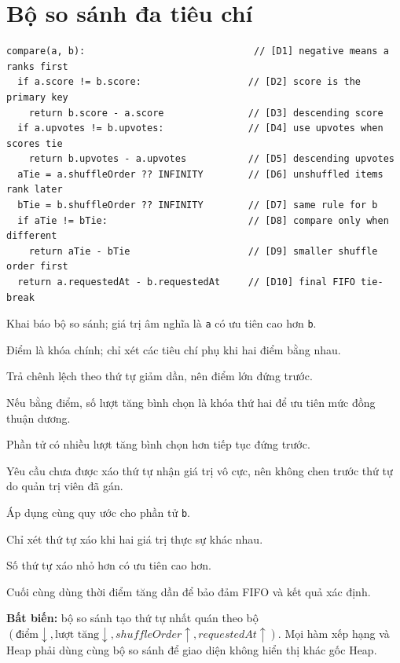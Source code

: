 \documentclass[12pt,a4paper,twoside,openright]{report}
\newcommand{\code}[1]{\texttt{#1}}
\begin{document}
\section{Bộ so sánh đa tiêu chí}
\begin{lstlisting}[style=algorithm]
compare(a, b):                              // [D1] negative means a ranks first
  if a.score != b.score:                   // [D2] score is the primary key
    return b.score - a.score               // [D3] descending score
  if a.upvotes != b.upvotes:               // [D4] use upvotes when scores tie
    return b.upvotes - a.upvotes           // [D5] descending upvotes
  aTie = a.shuffleOrder ?? INFINITY        // [D6] unshuffled items rank later
  bTie = b.shuffleOrder ?? INFINITY        // [D7] same rule for b
  if aTie != bTie:                         // [D8] compare only when different
    return aTie - bTie                     // [D9] smaller shuffle order first
  return a.requestedAt - b.requestedAt     // [D10] final FIFO tie-break
\end{lstlisting}
\begin{description}[leftmargin=1.2cm,labelwidth=0.8cm,style=multiline,
  font=\ttfamily\bfseries,itemsep=2pt]
  \item[D1] Khai báo bộ so sánh; giá trị âm nghĩa là \code{a} có ưu tiên cao hơn \code{b}.
  \item[D2] Điểm là khóa chính; chỉ xét các tiêu chí phụ khi hai điểm bằng nhau.
  \item[D3] Trả chênh lệch theo thứ tự giảm dần, nên điểm lớn đứng trước.
  \item[D4] Nếu bằng điểm, số lượt tăng bình chọn là khóa thứ hai để ưu tiên mức đồng thuận dương.
  \item[D5] Phần tử có nhiều lượt tăng bình chọn hơn tiếp tục đứng trước.
  \item[D6] Yêu cầu chưa được xáo thứ tự nhận giá trị vô cực, nên không chen trước thứ tự
  do quản trị viên đã gán.
  \item[D7] Áp dụng cùng quy ước cho phần tử \code{b}.
  \item[D8] Chỉ xét thứ tự xáo khi hai giá trị thực sự khác nhau.
  \item[D9] Số thứ tự xáo nhỏ hơn có ưu tiên cao hơn.
  \item[D10] Cuối cùng dùng thời điểm tăng dần để bảo đảm FIFO và kết quả xác định.
\end{description}
\textbf{Bất biến:} bộ so sánh tạo thứ tự nhất quán theo bộ
$(\text{điểm}\downarrow,\text{lượt tăng}\downarrow,shuffleOrder\uparrow,requestedAt\uparrow)$.
Mọi hàm xếp hạng và Heap phải dùng cùng bộ so sánh để giao diện không hiển thị khác gốc Heap.
\end{document}
